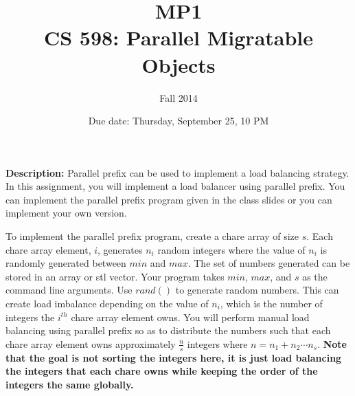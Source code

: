 \documentclass{article}
\title{MP1 \\ CS 598: Parallel Migratable Objects}
\author{Fall 2014}
\date{Due date: Thursday, September 25, 10 PM}
\begin{document}
\maketitle

\textbf{Description:} 
Parallel prefix can be used to implement a load balancing strategy. In this
assignment, you will implement a load balancer using parallel prefix. You
can implement the parallel prefix program given in the class slides or you
can implement your own version. 


To implement the parallel prefix program, create a chare array of size $s$. Each
chare array element, $i$, generates $n_i$ random integers where the value of
$n_i$ is randomly generated between $min$ and $max$. The set of numbers generated
can be stored in an array or stl vector. Your program takes $min$,
$max$, and $s$ as the command line arguments. Use $rand()$ to generate random
numbers. This can create load imbalance depending on the value of $n_i$, which is
the number of integers the $i^{th}$ chare array element owns. You will perform manual load
balancing using parallel prefix so as to distribute the numbers such that each
chare array element owns approximately  $\frac{n}{s}$ integers where  $n = n_1 +
n_2 \cdots n_s$. \textbf{Note that the goal is not sorting the integers here, it is just load balancing the integers that each chare owns while keeping the order of the integers the same globally.}\\


\end{document}
